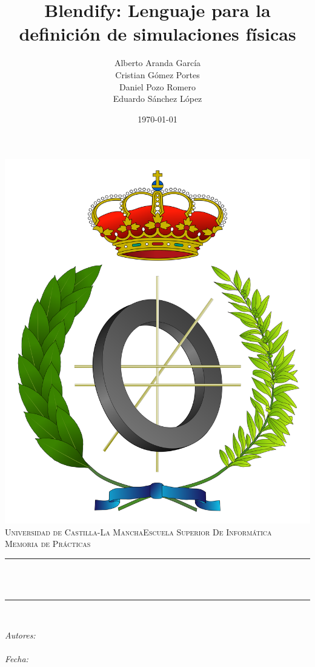 \documentclass[12pt]{article}
\title{Blendify: Lenguaje para la definición de simulaciones físicas}			%
\author{Alberto Aranda García \\ Cristian Gómez Portes \\ Daniel Pozo Romero \\ Eduardo Sánchez López}				%
\date{\today}				%
\makeatletter
\let\thetitle\@title
\let\theauthor\@author
\let\thedate\@date
\makeatother
\begin{document}

\begin{titlepage}
	\centering
    \vspace*{0.5 cm}
    \includegraphics[scale = 0.15]{informatica.png}\\[1.0 cm]										%
    \textsc{\LARGE Universidad de Castilla-La Mancha\newline\newline Escuela Superior De Informática}\\[2.0 cm]		%
	\textsc{\Large Memoria de Prácticas}\\[0.5 cm]												%
	\rule{\linewidth}{0.2 mm} \\[0.4 cm]
	{ \huge \bfseries \thetitle}\\
	\rule{\linewidth}{0.2 mm} \\[1.5 cm]
	
	\begin{minipage}{0.4\textwidth}
		\begin{center} \large
			\emph{Autores:}\\
			\theauthor\\
			\vspace*{1 cm}
			\emph{Fecha:}\\
			\thedate\\
			\end{center}
        
	\end{minipage}\\[2 cm]
	
\end{titlepage}
\end{document}
